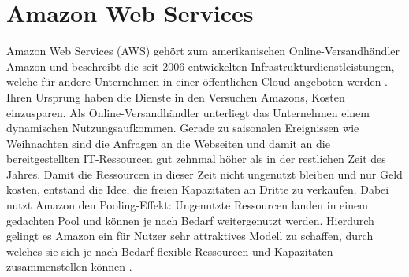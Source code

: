 \chapter{Amazon Web Services}\label{chapter:kapitellabel} %
Amazon Web Services (AWS) gehört zum amerikanischen Online-Versandhändler Amazon und beschreibt die
seit 2006 entwickelten Infrastrukturdienstleistungen, welche für andere Unternehmen in einer öffentlichen Cloud angeboten
werden \cite{aws:general}. Ihren Ursprung haben die Dienste in den Versuchen Amazons, Kosten einzusparen. Als Online-Versandhändler unterliegt das Unternehmen einem dynamischen
Nutzungsaufkommen. Gerade zu saisonalen Ereignissen wie Weihnachten sind die Anfragen
an die Webseiten und damit an die bereitgestellten IT-Ressourcen gut zehnmal höher als
in der restlichen Zeit des Jahres. Damit die Ressourcen in dieser Zeit nicht ungenutzt
bleiben und nur Geld kosten, entstand die Idee, die freien Kapazitäten an Dritte zu verkaufen.
Dabei nutzt Amazon den Pooling-Effekt: Ungenutzte Ressourcen landen in einem gedachten Pool und
können je nach Bedarf weitergenutzt werden. Hierdurch gelingt es Amazon ein für Nutzer
sehr attraktives Modell zu schaffen, durch welches sie sich je nach Bedarf flexible
Ressourcen und Kapazitäten zusammenstellen können \cite{baun:cloudcomp}.

